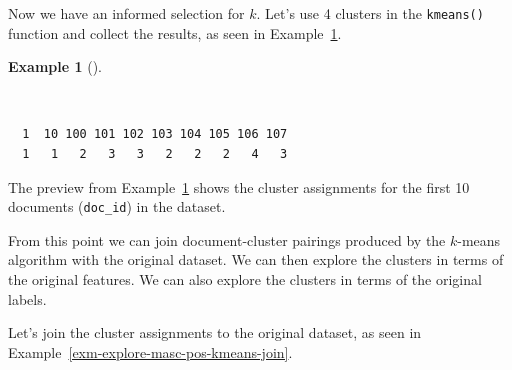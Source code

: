 \documentclass[
  letterpaper,
  krantz1]{latex/krantz-mod}
\newenvironment{Shaded}{\begin{snugshade}}{\end{snugshade}}
\newcommand{\AttributeTok}[1]{\textcolor[rgb]{0.00,0.00,0.00}{#1}}
\newcommand{\CommentTok}[1]{\textcolor[rgb]{0.00,0.00,0.00}{\textit{#1}}}
\newcommand{\DecValTok}[1]{\textcolor[rgb]{0.00,0.00,0.00}{#1}}
\newcommand{\FunctionTok}[1]{\textcolor[rgb]{0.00,0.00,0.00}{#1}}
\newcommand{\NormalTok}[1]{\textcolor[rgb]{0.00,0.00,0.00}{#1}}
\newcommand{\OtherTok}[1]{\textcolor[rgb]{0.00,0.00,0.00}{#1}}
\newcommand{\SpecialCharTok}[1]{\textcolor[rgb]{0.00,0.00,0.00}{#1}}
\theoremstyle{definition}
\newtheorem{example}{Example}[chapter]
\theoremstyle{definition}
\theoremstyle{remark}
\begin{document}
Now we have an informed selection for \(k\). Let's use 4 clusters in the
\texttt{kmeans()} function and collect the results, as seen in
Example~\ref{exm-explore-masc-pos-kmeans-fit}.

\pagebreak

\begin{example}[]\protect\hypertarget{exm-explore-masc-pos-kmeans-fit}{}\label{exm-explore-masc-pos-kmeans-fit}

~

\begin{Shaded}
\end{Shaded}

\begin{verbatim}
  1  10 100 101 102 103 104 105 106 107 
  1   1   2   3   3   2   2   2   4   3 
\end{verbatim}

\end{example}

The preview from Example~\ref{exm-explore-masc-pos-kmeans-fit} shows the
cluster assignments for the first 10 documents (\texttt{doc\_id}) in the
dataset.

From this point we can join document-cluster pairings produced by the
\(k\)-means algorithm with the original dataset. We can then explore the
clusters in terms of the original features. We can also explore the
clusters in terms of the original labels.

Let's join the cluster assignments to the original dataset, as seen in
Example~\ref{exm-explore-masc-pos-kmeans-join}.
\end{document}
